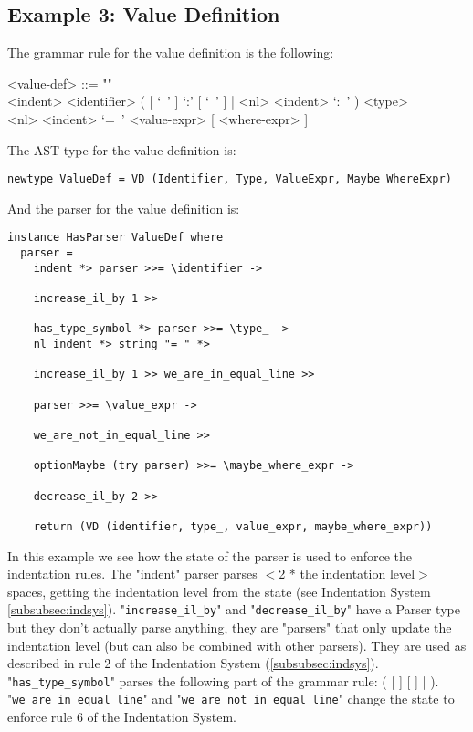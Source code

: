 \documentclass[diploma]{softlab-thesis}
\begin{document}
\newpage
\subsection{Example 3: Value Definition}

The grammar rule for the value definition is the following:
\begin{grammar}
<value-def> ::= ""\\
<indent> <identifier>
( [ `\ ' ] `:' [ `\ ' ] | <nl> <indent> `:\ ' ) <type>  \\
<nl> <indent> `=\ ' <value-expr> [ <where-expr> ]
\\
\end{grammar}
The AST type for the value definition is:
\begin{verbatim}
newtype ValueDef = VD (Identifier, Type, ValueExpr, Maybe WhereExpr)

\end{verbatim}
And the parser for the value definition is:
\begin{verbatim}
instance HasParser ValueDef where
  parser =
    indent *> parser >>= \identifier ->

    increase_il_by 1 >>

    has_type_symbol *> parser >>= \type_ ->
    nl_indent *> string "= " *>

    increase_il_by 1 >> we_are_in_equal_line >>

    parser >>= \value_expr ->

    we_are_not_in_equal_line >>

    optionMaybe (try parser) >>= \maybe_where_expr ->

    decrease_il_by 2 >>

    return (VD (identifier, type_, value_expr, maybe_where_expr))

\end{verbatim}
In this example we see how the state of the parser is used to enforce the
indentation rules. The "indent" parser parses $<$2 * the indentation level$>$
spaces, getting the indentation level from the state (see Indentation System
\ref{subsubsec:indsys}).  "\verb|increase_il_by|" and "\verb|decrease_il_by|"
have a Parser type but they don't actually parse anything, they are "parsers"
that only update the indentation level (but can also be combined with other
parsers).  They are used as described in rule 2 of the Indentation System
(\ref{subsubsec:indsys}). "\verb|has_type_symbol|" parses the following part of
the grammar rule: ( [ \lit{\ } ] \lit{:} [ \lit{\ } ] \verb||| 
 \lit{:\ }).  "\verb|we_are_in_equal_line|" and
"\verb|we_are_not_in_equal_line|" change the state to enforce rule 6 of the
Indentation System.
\end{document}
